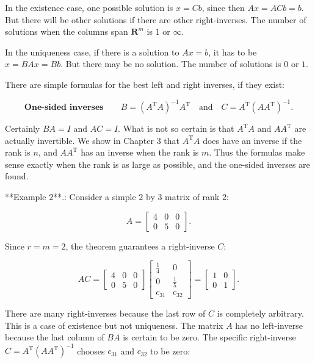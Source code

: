 In the existence case, one possible solution is \(x=Cb\), since then \(Ax=ACb=b\). But there will be other solutions if there are other right-inverses. The number of solutions when the columns span \(\mathbf{R}^{m}\) is \(1\) or \(\infty\).

In the uniqueness case, if there is a solution to \(Ax=b\), it has to be \(x=BAx=Bb\). But there may be no solution. The number of solutions is \(0\) or \(1\).

There are simple formulas for the best left and right inverses, if they exist:

\[\mathbf{One\text{-sided inverses}}\qquad B=(A^{\mathrm{T}}A)^{-1}A^{\mathrm{T}} \quad\text{and}\quad C=A^{\mathrm{T}}(AA^{\mathrm{T}})^{-1}.\]

Certainly \(BA=I\) and \(AC=I\). What is not so certain is that \(A^{\mathrm{T}}A\) and \(AA^{\mathrm{T}}\) are actually invertible. We show in Chapter 3 that \(A^{\mathrm{T}}A\) does have an inverse if the rank is \(n\), and \(AA^{\mathrm{T}}\) has an inverse when the rank is \(m\). Thus the formulas make sense exactly when the rank is as large as possible, and the one-sided inverses are found.

**Example 2**.: Consider a simple \(2\) by \(3\) matrix of rank \(2\):

\[A=\begin{bmatrix}4&0&0\\ 0&5&0\end{bmatrix}.\]

Since \(r=m=2\), the theorem guarantees a right-inverse \(C\):

\[AC=\begin{bmatrix}4&0&0\\ 0&5&0\end{bmatrix}\begin{bmatrix}\frac{1}{4}&0\\ 0&\frac{1}{5}\\ c_{31}&c_{32}\end{bmatrix}=\begin{bmatrix}1&0\\ 0&1\end{bmatrix}.\]

There are many right-inverses because the last row of \(C\) is completely arbitrary. This is a case of existence but not uniqueness. The matrix \(A\) has no left-inverse because the last column of \(BA\) is certain to be zero. The specific right-inverse \(C=A^{\mathrm{T}}(AA^{\mathrm{T}})^{-1}\) chooses \(c_{31}\) and \(c_{32}\) to be zero:

